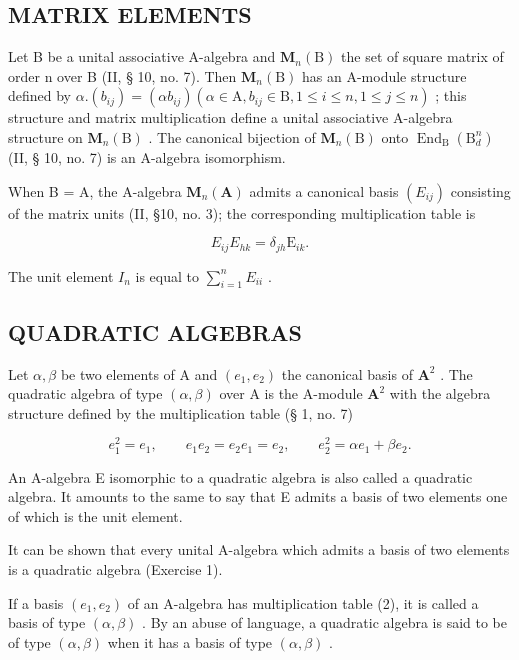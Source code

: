 \subsection{MATRIX ELEMENTS}

Let B be a unital associative A-algebra and \(\mathbf{M}_{n}(\mathrm{B})\) the set of square matrix of order n over B (II, § 10, no. 7). Then \(\mathbf{M}_{n}(\mathrm{B})\) has an A-module structure defined by \(\alpha.(b_{ij})=(\alpha b_{ij})(\alpha\in\mathrm{A},b_{ij}\in\mathrm{B},1\leqslant i\leqslant n,1\leqslant j\leqslant n)\) ; this structure and matrix multiplication define a unital associative A-algebra structure on \(\mathbf{M}_{n}(\mathrm{B})\) . The canonical bijection of \(\mathbf{M}_{n}(\mathrm{B})\) onto \(\operatorname{End}_{\mathrm{B}}(\mathrm{B}_{d}^{n})\) (II, § 10, no. 7) is an A-algebra isomorphism.

When B = A, the A-algebra \(\mathbf{M}_{n}(\mathbf{A})\) admits a canonical basis \((E_{ij})\) consisting of the matrix units (II, §10, no. 3); the corresponding multiplication table is

\[
E _ {i j} E _ {h k} = \delta_ {j h} \mathrm{E} _ {i k}.\tag{1}
\]

The unit element \(I_{n}\) is equal to \(\sum_{i=1}^{n} E_{ii}\) .

\subsection{QUADRATIC ALGEBRAS}

Let \(\alpha, \beta\) be two elements of A and \((e_1, e_2)\) the canonical basis of \(\mathbf{A}^2\) . The quadratic algebra of type \((\alpha, \beta)\) over A is the A-module \(\mathbf{A}^2\) with the algebra structure defined by the multiplication table (§ 1, no. 7)

\[
e _ {1} ^ {2} = e _ {1}, \qquad e _ {1} e _ {2} = e _ {2} e _ {1} = e _ {2}, \qquad e _ {2} ^ {2} = \alpha e _ {1} + \beta e _ {2}.\tag{2}
\]

An A-algebra E isomorphic to a quadratic algebra is also called a quadratic algebra. It amounts to the same to say that E admits a basis of two elements one of which is the unit element.

It can be shown that every unital A-algebra which admits a basis of two elements is a quadratic algebra (Exercise 1).

If a basis \((e_{1}, e_{2})\) of an A-algebra has multiplication table (2), it is called a basis of type \((\alpha, \beta)\) . By an abuse of language, a quadratic algebra is said to be of type \((\alpha, \beta)\) when it has a basis of type \((\alpha, \beta)\) .


